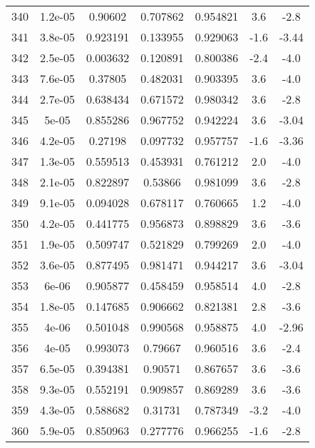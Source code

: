 \begin{table}
\begin{tabular}{c|c|c|c|c|c|c}
340 & 1.2e-05 & 0.90602 & 0.707862 & 0.954821 & 3.6 & -2.8\\
341 & 3.8e-05 & 0.923191 & 0.133955 & 0.929063 & -1.6 & -3.44\\
342 & 2.5e-05 & 0.003632 & 0.120891 & 0.800386 & -2.4 & -4.0\\
343 & 7.6e-05 & 0.37805 & 0.482031 & 0.903395 & 3.6 & -4.0\\
344 & 2.7e-05 & 0.638434 & 0.671572 & 0.980342 & 3.6 & -2.8\\
345 & 5e-05 & 0.855286 & 0.967752 & 0.942224 & 3.6 & -3.04\\
346 & 4.2e-05 & 0.27198 & 0.097732 & 0.957757 & -1.6 & -3.36\\
347 & 1.3e-05 & 0.559513 & 0.453931 & 0.761212 & 2.0 & -4.0\\
348 & 2.1e-05 & 0.822897 & 0.53866 & 0.981099 & 3.6 & -2.8\\
349 & 9.1e-05 & 0.094028 & 0.678117 & 0.760665 & 1.2 & -4.0\\
350 & 4.2e-05 & 0.441775 & 0.956873 & 0.898829 & 3.6 & -3.6\\
351 & 1.9e-05 & 0.509747 & 0.521829 & 0.799269 & 2.0 & -4.0\\
352 & 3.6e-05 & 0.877495 & 0.981471 & 0.944217 & 3.6 & -3.04\\
353 & 6e-06 & 0.905877 & 0.458459 & 0.958514 & 4.0 & -2.8\\
354 & 1.8e-05 & 0.147685 & 0.906662 & 0.821381 & 2.8 & -3.6\\
355 & 4e-06 & 0.501048 & 0.990568 & 0.958875 & 4.0 & -2.96\\
356 & 4e-05 & 0.993073 & 0.79667 & 0.960516 & 3.6 & -2.4\\
357 & 6.5e-05 & 0.394381 & 0.90571 & 0.867657 & 3.6 & -3.6\\
358 & 9.3e-05 & 0.552191 & 0.909857 & 0.869289 & 3.6 & -3.6\\
359 & 4.3e-05 & 0.588682 & 0.31731 & 0.787349 & -3.2 & -4.0\\
360 & 5.9e-05 & 0.850963 & 0.277776 & 0.966255 & -1.6 & -2.8\\
\end{tabular}
\end{table}
\newpage
